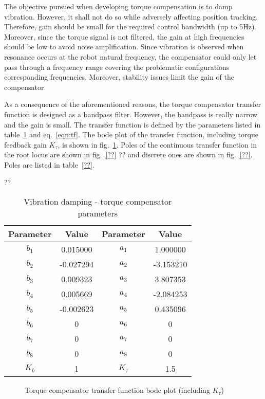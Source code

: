 The objective pursued when developing torque compensation is to damp vibration. However, it shall not do so while adversely affecting position tracking. Therefore, gain should be small for the required control bandwidth (up to 5Hz). Moreover, since the torque signal is not filtered, the gain at high frequencies should be low to avoid noise amplification. Since vibration is observed when resonance occurs at the robot natural frequency, the compensator could only let pass through a frequency range covering the problematic configurations corresponding frequencies. Moreover, stability issues limit the gain of the compensator.

As a consequence of the aforementioned reasons, the torque compensator transfer function is designed as a bandpass filter. However, the bandpass is really narrow and the gain is small. The transfer function is defined by the parameters listed in table~\ref{table:compensator} and eq.~\ref{eqn:tf}. The bode plot of the transfer function, including torque feedback gain $K_{\tau}$, is shown in fig.~\ref{fig:bodeComp}. Poles of the continuous transfer function in the root locus are shown in fig.~\ref{??} ?? and discrete ones are shown in fig.~\ref{??}. Poles are listed in table~\ref{??}.

\begin{table}[t]
	\caption{Vibration damping - torque compensator parameters}
	\centering                                                                      
	\hfill \break??
	\begin{tabular}{c|c||c|c}                                                
		\hline                                                                          
		Parameter & Value & Parameter & Value \\
		\hline
		$b_1$ & 0.015000 & $a_1$ & 1.000000  \\
		\hline
		$b_2$ & -0.027294 & $a_2$ & -3.153210 \\
		\hline
		$b_3$ & 0.009323 & $a_3$ & 3.807353 \\
		\hline
		$b_4$ & 0.005669 & $a_4$ & -2.084253 \\
		\hline
		$b_5$ & -0.002623 & $a_5$ & 0.435096 \\
		\hline
		$b_6$ & 0 & $a_6$ & 0 \\
		\hline
		$b_7$ & 0 & $a_7$ & 0 \\
		\hline
		$b_8$ & 0 & $a_8$ & 0 \\
		\hline
		$K_b$ & 1 & $K_{\tau}$ & 1.5 \\
		\hline
	\end{tabular}
	\label{table:compensator}
\end{table}

	\begin{figure}
		\begin{center}
			\def\svgwidth{.75\textwidth}%
			
			\caption{Torque compensator transfer function bode plot (including $K_{\tau}$)}
			\label{fig:bodeComp}
		\end{center}
	\end{figure}
